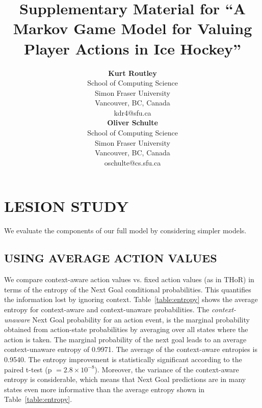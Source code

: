 \documentclass[]{article}
\title{Supplementary Material for ``A Markov Game Model for Valuing Player Actions in Ice Hockey''}
\author{ {\bf Kurt Routley}\\School of Computing Science\\Simon Fraser University\\Vancouver, BC, Canada\\kdr4@sfu.ca\\
\And
{\bf Oliver Schulte}\\School of Computing Science\\Simon Fraser University\\Vancouver, BC, Canada\\oschulte@cs.sfu.ca}
\begin{document}
\maketitle

\section{LESION STUDY}
\label{sec:lesion}

We evaluate the components of our full model by considering simpler  models.

\subsection{USING AVERAGE ACTION VALUES}

We  compare context-aware action values vs. fixed action values (as in THoR) in terms of   the entropy of the Next Goal conditional probabilities. This quantifies the information lost by ignoring context.
Table~\ref{table:entropy} shows the average entropy for context-aware and context-unaware probabilities.
%
The {\em context-unaware} Next Goal probability for an action event, is the marginal probability obtained from action-state probabilities by averaging over all states where the action is taken. %
The marginal probability of the next goal leads to an average context-unaware entropy of 0.9971. The average of the context-aware entropies is 0.9540. The entropy improvement is statistically significant according to the paired t-test (p $=2.8\times10^{-8}$).
Moreover, the variance of the context-aware entropy is considerable, which means that Next Goal predictions are in many states even more informative than the average entropy shown in Table~\ref{table:entropy}.%
%
\end{document}
